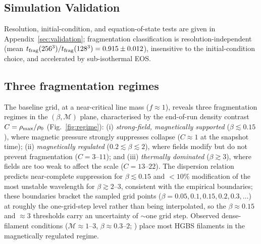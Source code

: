 \documentclass[usenatbib,twoside,twocolumn]{mnras}
\begin{document}
\subsection{Simulation Validation}

Resolution, initial-condition, and equation-of-state tests are given in Appendix~\ref{sec:validation}; fragmentation classification is resolution-independent (mean $t_{\rm frag}(256^3)/t_{\rm frag}(128^3)=0.915\pm0.012$), insensitive to the initial-condition choice, and accelerated by sub-isothermal EOS.

\subsection{Three fragmentation regimes}

The baseline grid, at a near-critical line mass ($f\approx1$), reveals three fragmentation regimes in the $(\beta,\mathcal{M})$ plane, characterised by the end-of-run density contrast $C=\rho_{\rm max}/\rho_0$ (Fig.~\ref{fig:regime}): (i) \emph{strong-field, magnetically supported} ($\beta\lesssim0.15$), where magnetic pressure strongly suppresses collapse ($C\approx1$ at the snapshot time); (ii) \emph{magnetically regulated} ($0.2\lesssim\beta\lesssim2$), where fields modify but do not prevent fragmentation ($C=3$--$11$); and (iii) \emph{thermally dominated} ($\beta\gtrsim3$), where fields are too weak to affect the scale ($C=13$--$22$). The dispersion relation \citep{Nakamura1993} predicts near-complete suppression for $\beta\lesssim0.15$ and $<10\%$ modification of the most unstable wavelength for $\beta\gtrsim2$--$3$, consistent with the empirical boundaries; these boundaries bracket the sampled grid points ($\beta=0.05,0.1,0.15,0.2,0.3,\ldots$) at roughly the one-grid-step level rather than being interpolated, so the $\beta\approx0.15$ and $\approx3$ thresholds carry an uncertainty of $\sim$one grid step. Observed dense-filament conditions ($\mathcal{M}\approx1$--$3$, $\beta\approx0.3$--$2$; \citealt{Arzoumanian2019,Planck2016,Pattle2018}) place most HGBS filaments in the magnetically regulated regime.
\end{document}
